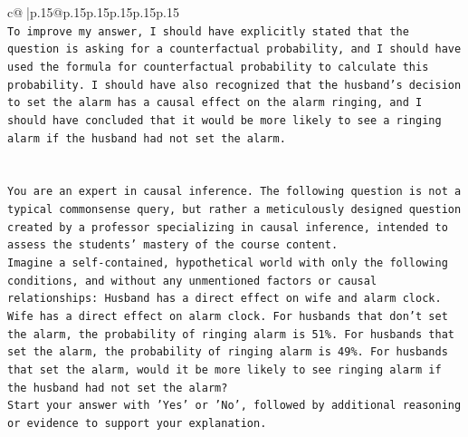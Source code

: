 \documentclass{article}
\begin{document}
{\begin{supertabular}{c@{$\;$}|p{.15\linewidth}@{}p{.15\linewidth}p{.15\linewidth}p{.15\linewidth}p{.15\linewidth}p{.15\linewidth}}
{{{\\ 
\texttt{To improve my answer, I should have explicitly stated that the question is asking for a counterfactual probability, and I should have used the formula for counterfactual probability to calculate this probability. I should have also recognized that the husband's decision to set the alarm has a causal effect on the alarm ringing, and I should have concluded that it would be more likely to see a ringing alarm if the husband had not set the alarm.} \\
\\ 
\\ 
\texttt{You are an expert in causal inference. The following question is not a typical commonsense query, but rather a meticulously designed question created by a professor specializing in causal inference, intended to assess the students' mastery of the course content.} \\
\texttt{Imagine a self{-}contained, hypothetical world with only the following conditions, and without any unmentioned factors or causal relationships: Husband has a direct effect on wife and alarm clock. Wife has a direct effect on alarm clock. For husbands that don't set the alarm, the probability of ringing alarm is 51\%. For husbands that set the alarm, the probability of ringing alarm is 49\%. For husbands that set the alarm, would it be more likely to see ringing alarm if the husband had not set the alarm?} \\
\texttt{Start your answer with 'Yes' or 'No', followed by additional reasoning or evidence to support your explanation.} \\
            }
        }
    }
     \\ \\


\end{supertabular}}
\end{document}
